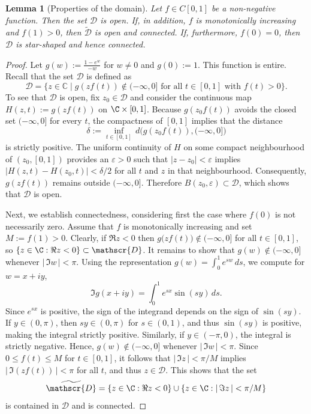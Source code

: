 \documentclass[11pt,a4paper]{scrartcl}
\numberwithin{equation}{section}
\theoremstyle{plain}
\newtheorem{lemma}{Lemma}[section]
\theoremstyle{definition}
\theoremstyle{remark}
\begin{document}
\begin{lemma}[Properties of the domain]\label{lem: properties of Df}
Let $f \in C[0, 1]$ be a non-negative function. Then the set $\mathscr{D}$ is open.
If, in addition, $f$ is monotonically increasing and $f(1)>0$, then $\widetilde{\mathscr{D}}$ is open and connected. If, furthermore, $f(0) = 0$, then $\mathscr{D}$ is star-shaped and hence connected.
\end{lemma}
\begin{proof}
Let $g(w) := \frac{1-e^{w}}{-w}$ for $w \ne 0$ and $g(0) := 1$. This function is entire. Recall that the set $\mathscr{D}$ is defined as
\[
\mathscr{D} = \{z \in \mathbb{C} \mid g(zf(t)) \notin (-\infty, 0] \text{ for all } t \in [0, 1] \text{ with } f(t)>0\}.
\]
To see that $\mathscr{D}$ is open, fix $z_0\in \mathscr{D}$ and consider the continuous map $H(z,t):=g(zf(t))$ on $\C\times[0,1]$. Because $g(z_0f(t))$ avoids the closed set $(-\infty,0]$ for every $t$, the compactness of $[0,1]$ implies that the distance
\[
\delta:=\inf_{t\in[0,1]}\,d\bigl(g(z_0f(t)),(-\infty,0]\bigr)
\]
is strictly positive. The uniform continuity of $H$ on some compact neighbourhood of $(z_0,[0,1])$ provides an $\varepsilon>0$ such that $|z-z_0|<\varepsilon$ implies $|H(z,t)-H(z_0,t)|<\delta/2$ for all $t$ and $z$ in that neighbourhood. Consequently, $g(zf(t))$ remains outside $(-\infty,0]$. Therefore $B(z_0,\varepsilon)\subset \mathscr{D}$, which shows that $\mathscr{D}$ is open.

Next, we establish connectedness, considering first the case where $f(0)$ is not necessarily zero. Assume that $f$ is monotonically increasing and set $M:=f(1)>0$. Clearly, if $\Re z<0$ then $g\bigl(zf(t)\bigr)\notin(-\infty,0]$ for all $t\in[0,1]$, so $\{z\in\C:\Re z<0\}\subset \mathscr{D}$. It remains to show that $g(w)\notin(-\infty,0]$ whenever $|\,\Im w\,|<\pi$. Using the representation $g(w)=\int_{0}^{1}e^{sw}\,ds$, we compute for $w=x+iy$,
\[
\Im g(x+iy)=\int_{0}^{1}e^{sx}\sin(sy)\,ds.
\]
Since $e^{sx}$ is positive, the sign of the integrand depends on the sign of $\sin(sy)$. If $y\in (0,\pi)$, then $sy\in (0, \pi)$ for $s\in(0,1)$, and thus $\sin(sy)$ is positive, making the integral strictly positive. Similarly, if $y\in (-\pi, 0)$, the integral is strictly negative. Hence, $g(w)\notin(-\infty,0]$ whenever $|\,\Im w\,|<\pi$. Since $0\le f(t)\le M$ for $t\in[0,1]$, it follows that $|\,\Im z\,|<\pi/M$ implies $|\,\Im(zf(t))\,|<\pi$ for all $t$, and thus $z\in\mathscr{D}$. This shows that the set
\[
\widetilde{\mathscr{D}}=\{z\in\C:\Re z<0\}\cup\{z\in\C:|\,\Im z\,|<\pi/M\}
\]
is contained in $\mathscr{D}$ and is connected.


\end{proof}
\end{document}
